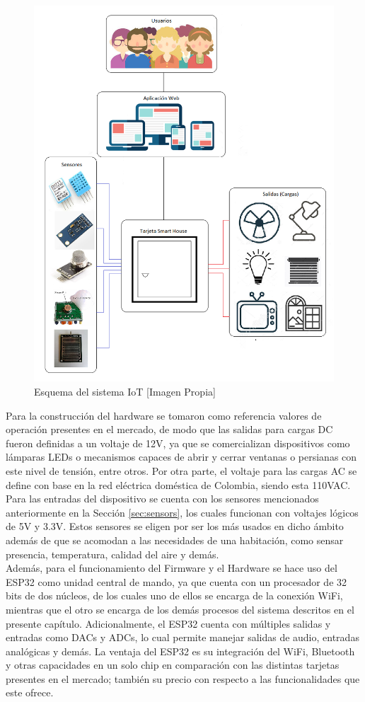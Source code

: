 \begin{figure}[H]
	\centering
	\includegraphics[width=0.7\linewidth]{Imagenes/Diagramas}
	\caption{Esquema del sistema IoT [Imagen Propia]}
	\label{fig:diagramas}
\end{figure}

Para la construcción del hardware se tomaron como referencia valores de operación presentes en el mercado, de modo que las salidas para cargas DC fueron definidas a un voltaje de 12V, ya que se comercializan dispositivos como lámparas LEDs o mecanismos capaces de abrir y cerrar ventanas o persianas con este nivel de tensión, entre otros. Por otra parte, el voltaje para las cargas AC se define con base en la red eléctrica doméstica de Colombia, siendo esta 110VAC. Para las entradas del dispositivo se cuenta con los sensores mencionados anteriormente en la Sección \ref{sec:sensors}, los cuales funcionan con voltajes lógicos de 5V y 3.3V. Estos sensores se eligen por ser los más usados en dicho ámbito además de que se acomodan a las necesidades de una habitación, como sensar presencia, temperatura, calidad del aire y demás.\\

Además, para el funcionamiento del Firmware y el Hardware se hace uso del ESP32 como unidad central de mando, ya que cuenta con un procesador de 32 bits de dos núcleos, de los cuales uno de ellos se encarga de la conexión WiFi, mientras que el otro se encarga de los demás procesos del sistema descritos en el presente capítulo. Adicionalmente, el ESP32 cuenta con múltiples salidas y entradas como DACs y ADCs, lo cual permite manejar salidas de audio, entradas analógicas y demás. La ventaja del ESP32 es su integración del WiFi, Bluetooth y otras capacidades en un solo chip en comparación con las distintas tarjetas presentes en el mercado; también su precio con respecto a las funcionalidades que este ofrece.\\



